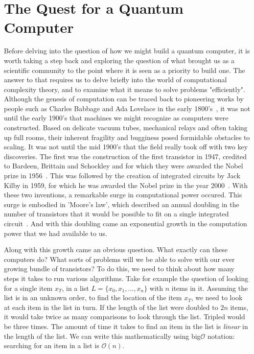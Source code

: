 \chapter{The Quest for a Quantum Computer}
Before delving into the question of how we might build a quantum computer, it is worth taking a step
back and exploring the question of what brought us as a scientific community to the point where
it is seen as a priority to build one. The answer to that requires us to delve briefly into
the world of computational complexity theory, and to examine what it means to solve problems "efficiently".
Although the genesis of computation can be traced back to pioneering works by people such as Charles Babbage
and Ada Lovelace in the early 1800's~\cite{Bowden:1953:FTS:1102044}, it was not until the early 1900's that
machines we might recognize as computers were constructed. Based on delicate vacuum tubes, mechanical relays
and often taking up full rooms, their inherent fragility and bugginess posed formidable obstacles to scaling. 
It was not until the mid 1900's that the field really took off with two key discoveries. The first
was the construction of the first transistor in 1947, credited to Bardeen, Brittain and Schockley and for which
they were awarded the Nobel prize in 1956~\cite{nobel1956}. This was followed by the creation of integrated circuits by Jack Kilby
in 1959, for which he was awarded the Nobel prize in the year 2000~\cite{nobel2000}. With these two inventions, a remarkable 
surge in computational power occured. This surge is embodied in 'Moore's law', which described an annual
doubling in the number of transistors that it would be possible to fit on a single integrated circuit~\cite{4785860}.
And with this doubling came an exponential growth in the computation power that we had available to us.

Along with this growth came an obvious question. What exactly can these computers do? What sorts of
problems will we be able to solve with our ever growing bundle of transistors? To do this, we need to
think about how many steps it takes to run various algorithms. Take for example the question of looking
for a single item $x_T$, in a list $L = \{x_0, x_1, ..., x_n\}$ with $n$ items in it. Assuming the list
is in an unknown order, to find the location of the item $x_T$, we need to look at each item in the list
in turn. If the length of the list were doubled to $2n$ items, it would take twice as many comparisons to
look through the list. Tripled would be three times. The amount of time it takes to find an item in the
list is \emph{linear} in the length of the list. We can write this mathematically using big$\mathcal{O}$ 
notation: searching for an item in a list is $\mathcal{O}(n)$. 

